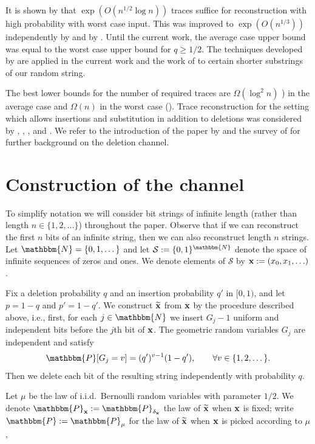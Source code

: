 \documentclass[final,12pt]{colt2018} %
\newcommand{\N}{\mathbbm{N}}
\renewcommand{\P}{\mathbbm{P}}
\newcommand{\1}{\mathbf{1}}
\def\cS{\mathcal{S}}
\def\cS{\mathcal{S}}
\newcommand{\eqbn}{\begin{equation*}}
\newcommand{\eqen}{\end{equation*}}
\newcommand{\wt}{\widetilde}
\def\xt{{\wt {\bf x}}}
\def\x{{\bf x}}
\begin{document}
It is shown by \cite{HMPW08} that $\exp(O(n^{1/2} \log n))$ traces suffice for reconstruction with high probability with worst case input. This was  improved to $\exp(O(n^{1/3}))$ independently by \citet*{DOS16} and by \citet*{NP16}. Until the current work, the average case upper bound was equal to the worst case upper bound for $q\geq 1/2$. The techniques developed by \cite{DOS16,NP16} are applied in the current work and the work of  \cite{PZ17} to certain shorter substrings of our random string.

The best lower bounds for the number of required traces are  $\Omega(\log^2 n)$
\citet*{MPV14}) in the average case and
$\Omega(n)$ in the worst case (\citet*{BKKM04}). Trace reconstruction for the setting which allows insertions and substitution in addition to deletions was considered by \citet*{KM05}, \citet*{VS08}, \citet*{DOS16}, and \citet*{NP16}. We refer to the introduction of the paper by \citet*{DOS16} and the survey of \citet*{M09} for further background on the deletion channel.


\section{Construction of the channel}
\label{sec:reconstruction}

To simplify notation we will consider bit strings of infinite length
(rather than length $n\in\{1,2,\dots \}$) throughout the paper. Observe that if we can reconstruct the first $n$ bits of an infinite string, then we can also reconstruct length $n$ strings.
Let $\N=\{0,1,\dots \}$ and let $\cS := \{ 0 , 1 \}^\N$ denote
the space of infinite sequences of zeros and ones.   We denote
elements of $\cS$ by $\x := (x_0 , x_1 , \ldots)$.

Fix a deletion probability $q$ and an insertion probability $q'$ in $[0,1)$,
and let $p=1-q$ and $p'=1-q'$.
We construct $\xt$ from $\x$ by the
procedure described above, i.e., first, for each $j\in\N$ we insert $G_j-1$ uniform and independent bits before the $j$th bit of $\x$. The geometric random variables $G_j$ are independent and satisfy
\eqbn
\P[ G_j=v ]=(q')^{v-1}(1- q'),\qquad\forall v\in\{1,2,\dots \}.
\eqen
Then we delete each bit of the resulting string independently with probability $q$.

Let $\mu$ be the law of i.i.d.\ Bernoulli random variables with parameter $1/2$.
We denote $\P_\x := \P_{\delta_\x}$ the law of $\xt$ when $\x$ is fixed; write   $\P := \P_\mu$ for the law of $\xt$ when $\x$ is picked according to $\mu$,
\end{document}
